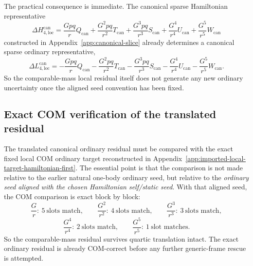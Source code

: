 \documentclass[11pt]{article}
\begin{document}
The practical consequence is immediate.  The canonical sparse Hamiltonian
representative
\begin{equation}
\Delta H_{4,\mathrm{loc}}^{\mathrm{can}}
=
\frac{Gpq}{r}Q_{\mathrm{can}}
+
\frac{G^2pq}{r^2}T_{\mathrm{can}}
+
\frac{G^3pq}{r^3}S_{\mathrm{can}}
+
\frac{G^4}{r^4}U_{\mathrm{can}}
+
\frac{G^5}{r^5}W_{\mathrm{can}}
\label{eq:app-ordinary-translation-canonical-hamiltonian-residual-repeat}
\end{equation}
constructed in Appendix~\ref{app:canonical-slice} already determines a
canonical sparse ordinary representative,
\begin{equation}
\Delta L_{4,\mathrm{loc}}^{\mathrm{can}}
=
-
\frac{Gpq}{r}Q_{\mathrm{can}}
-
\frac{G^2pq}{r^2}T_{\mathrm{can}}
-
\frac{G^3pq}{r^3}S_{\mathrm{can}}
-
\frac{G^4}{r^4}U_{\mathrm{can}}
-
\frac{G^5}{r^5}W_{\mathrm{can}}.
\label{eq:app-ordinary-translation-canonical-ordinary-residual}
\end{equation}
So the comparable-mass local residual itself does not generate any new ordinary
uncertainty once the aligned seed convention has been fixed.

\subsection{Exact COM verification of the translated residual}
\label{app:ordinary-translation-com-verification}

The translated canonical ordinary residual must be compared with the exact fixed
local COM ordinary target reconstructed in
Appendix~\ref{app:imported-local-target-hamiltonian-first}.  The essential
point is that the comparison is not made relative to the earlier natural
one-body ordinary seed, but relative to the \emph{ordinary seed aligned with the
chosen Hamiltonian self/static seed}.  With that aligned seed, the COM
comparison is exact block by block:
\begin{equation}
\frac{G}{r}:\ 5\ \text{slots match},
\qquad
\frac{G^2}{r^2}:\ 4\ \text{slots match},
\qquad
\frac{G^3}{r^3}:\ 3\ \text{slots match},
\label{eq:app-ordinary-translation-block-match-1}
\end{equation}
\begin{equation}
\frac{G^4}{r^4}:\ 2\ \text{slots match},
\qquad
\frac{G^5}{r^5}:\ 1\ \text{slot matches}.
\label{eq:app-ordinary-translation-block-match-2}
\end{equation}
So the comparable-mass residual survives quartic translation intact.  The exact
ordinary residual is already COM-correct before any further generic-frame rescue
is attempted.
\end{document}
